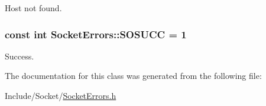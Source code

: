 \-Host not found. 

\hypertarget{class_socket_errors_aef601a9a9a2a3b7b354833d7d7845315}{
\subsubsection[{\-S\-O\-S\-U\-C\-C}]{\setlength{\rightskip}{0pt plus 5cm}const int {\bf \-Socket\-Errors\-::\-S\-O\-S\-U\-C\-C} = 1}}
\label{class_socket_errors_aef601a9a9a2a3b7b354833d7d7845315}


\-Success. 



\-The documentation for this class was generated from the following file\-:\begin{DoxyCompactItemize}
\item 
\-Include/\-Socket/\hyperlink{_socket_errors_8h}{\-Socket\-Errors.\-h}\end{DoxyCompactItemize}
